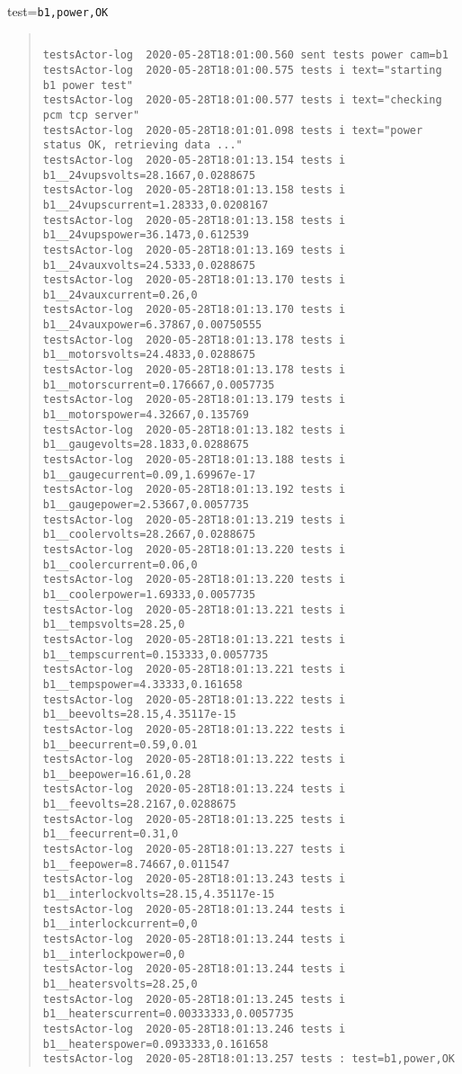 test=\texttt{b1,power,OK}
\begin{quote}
\begin{tiny}
\begin{verbatim}

testsActor-log  2020-05-28T18:01:00.560 sent tests power cam=b1
testsActor-log  2020-05-28T18:01:00.575 tests i text="starting b1 power test"
testsActor-log  2020-05-28T18:01:00.577 tests i text="checking pcm tcp server"
testsActor-log  2020-05-28T18:01:01.098 tests i text="power status OK, retrieving data ..."
testsActor-log  2020-05-28T18:01:13.154 tests i b1__24vupsvolts=28.1667,0.0288675
testsActor-log  2020-05-28T18:01:13.158 tests i b1__24vupscurrent=1.28333,0.0208167
testsActor-log  2020-05-28T18:01:13.158 tests i b1__24vupspower=36.1473,0.612539
testsActor-log  2020-05-28T18:01:13.169 tests i b1__24vauxvolts=24.5333,0.0288675
testsActor-log  2020-05-28T18:01:13.170 tests i b1__24vauxcurrent=0.26,0
testsActor-log  2020-05-28T18:01:13.170 tests i b1__24vauxpower=6.37867,0.00750555
testsActor-log  2020-05-28T18:01:13.178 tests i b1__motorsvolts=24.4833,0.0288675
testsActor-log  2020-05-28T18:01:13.178 tests i b1__motorscurrent=0.176667,0.0057735
testsActor-log  2020-05-28T18:01:13.179 tests i b1__motorspower=4.32667,0.135769
testsActor-log  2020-05-28T18:01:13.182 tests i b1__gaugevolts=28.1833,0.0288675
testsActor-log  2020-05-28T18:01:13.188 tests i b1__gaugecurrent=0.09,1.69967e-17
testsActor-log  2020-05-28T18:01:13.192 tests i b1__gaugepower=2.53667,0.0057735
testsActor-log  2020-05-28T18:01:13.219 tests i b1__coolervolts=28.2667,0.0288675
testsActor-log  2020-05-28T18:01:13.220 tests i b1__coolercurrent=0.06,0
testsActor-log  2020-05-28T18:01:13.220 tests i b1__coolerpower=1.69333,0.0057735
testsActor-log  2020-05-28T18:01:13.221 tests i b1__tempsvolts=28.25,0
testsActor-log  2020-05-28T18:01:13.221 tests i b1__tempscurrent=0.153333,0.0057735
testsActor-log  2020-05-28T18:01:13.221 tests i b1__tempspower=4.33333,0.161658
testsActor-log  2020-05-28T18:01:13.222 tests i b1__beevolts=28.15,4.35117e-15
testsActor-log  2020-05-28T18:01:13.222 tests i b1__beecurrent=0.59,0.01
testsActor-log  2020-05-28T18:01:13.222 tests i b1__beepower=16.61,0.28
testsActor-log  2020-05-28T18:01:13.224 tests i b1__feevolts=28.2167,0.0288675
testsActor-log  2020-05-28T18:01:13.225 tests i b1__feecurrent=0.31,0
testsActor-log  2020-05-28T18:01:13.227 tests i b1__feepower=8.74667,0.011547
testsActor-log  2020-05-28T18:01:13.243 tests i b1__interlockvolts=28.15,4.35117e-15
testsActor-log  2020-05-28T18:01:13.244 tests i b1__interlockcurrent=0,0
testsActor-log  2020-05-28T18:01:13.244 tests i b1__interlockpower=0,0
testsActor-log  2020-05-28T18:01:13.244 tests i b1__heatersvolts=28.25,0
testsActor-log  2020-05-28T18:01:13.245 tests i b1__heaterscurrent=0.00333333,0.0057735
testsActor-log  2020-05-28T18:01:13.246 tests i b1__heaterspower=0.0933333,0.161658
testsActor-log  2020-05-28T18:01:13.257 tests : test=b1,power,OK

\end{verbatim}
\end{tiny}
\end{quote}

